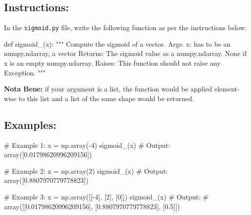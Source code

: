 \documentclass[]{article}
\newenvironment{Shaded}{\begin{snugshade}}{\end{snugshade}}
\newcommand{\CommentTok}[1]{\textcolor[rgb]{0.48,0.49,0.49}{#1}}
\newcommand{\DecValTok}[1]{\textcolor[rgb]{0.96,0.45,0.00}{#1}}
\newcommand{\FloatTok}[1]{\textcolor[rgb]{0.96,0.45,0.00}{#1}}
\newcommand{\KeywordTok}[1]{\textcolor[rgb]{0.81,0.81,0.76}{#1}}
\newcommand{\NormalTok}[1]{\textcolor[rgb]{0.81,0.81,0.76}{#1}}
\newcommand{\OperatorTok}[1]{\textcolor[rgb]{0.81,0.81,0.76}{#1}}
\begin{document}
\hypertarget{instructions-2}{%
\subsection{Instructions:}\label{instructions-2}}

In the \texttt{sigmoid.py} file, write the following function as per the
instructions below:

\begin{Shaded}
\begin{Highlighting}[]
\KeywordTok{def}\NormalTok{ sigmoid_(x):}
    \CommentTok{"""}
\CommentTok{    Compute the sigmoid of a vector.}
\CommentTok{    Args:}
\CommentTok{        x: has to be an numpy.ndarray, a vector}
\CommentTok{    Returns: }
\CommentTok{        The sigmoid value as a numpy.ndarray.}
\CommentTok{        None if x is an empty numpy.ndarray.}
\CommentTok{    Raises:}
\CommentTok{        This function should not raise any Exception.}
\CommentTok{    """}
\end{Highlighting}
\end{Shaded}

\textbf{Nota Bene:} if your argument is a list, the function would be
applied element-wise to this list and a list of the same shape would be
returned.

\hypertarget{examples-2}{%
\subsection{Examples:}\label{examples-2}}

\begin{Shaded}
\begin{Highlighting}[]
\CommentTok{# Example 1:}
\NormalTok{x }\OperatorTok{=}\NormalTok{ np.array(}\OperatorTok{-}\DecValTok{4}\NormalTok{)}
\NormalTok{sigmoid_(x)}
\CommentTok{# Output:}
\NormalTok{array([}\FloatTok{0.01798620996209156}\NormalTok{])}

\CommentTok{# Example 2:}
\NormalTok{x }\OperatorTok{=}\NormalTok{ np.array(}\DecValTok{2}\NormalTok{)}
\NormalTok{sigmoid_(x)}
\CommentTok{# Output:}
\NormalTok{array([}\FloatTok{0.8807970779778823}\NormalTok{])}

\CommentTok{# Example 3:}
\NormalTok{x }\OperatorTok{=}\NormalTok{ np.array([[}\OperatorTok{-}\DecValTok{4}\NormalTok{], [}\DecValTok{2}\NormalTok{], [}\DecValTok{0}\NormalTok{]])}
\NormalTok{sigmoid_(x)}
\CommentTok{# Output:}
\CommentTok{# array([[0.01798620996209156], [0.8807970779778823], [0.5]])}
\end{Highlighting}
\end{Shaded}
\end{document}
